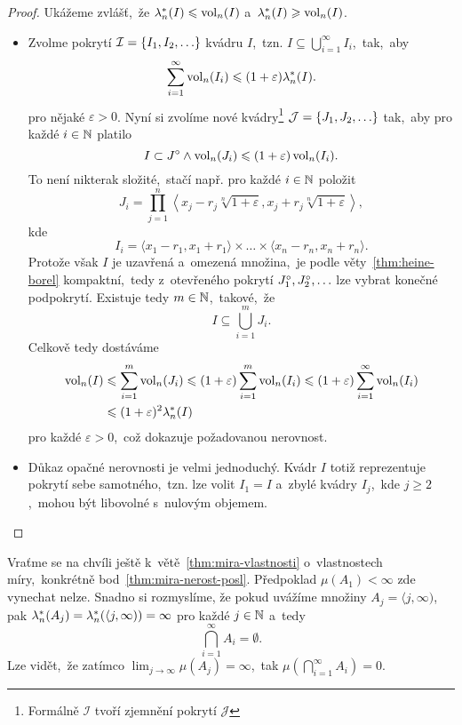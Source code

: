 \begin{proof}
    Ukážeme zvlášť,~že $\lambda_n^*(I)\leqslant\operatorname{vol}_n(I)$ a~$\lambda_n^*(I)\geqslant\operatorname{vol}_n(I)$.
    \begin{itemize}
        \item Zvolme pokrytí $\mathcal{I}=\left\{I_1,I_2,\ldots\right\}$ kvádru $I$,~tzn. $I\subseteq\bigcup_{i=1}^\infty I_i$,~tak,~aby
        \[\sum_{i=1}^{\infty}\operatorname{vol}_n(I_i)\leqslant(1+\varepsilon)\lambda_n^*(I).\]
        pro nějaké $\varepsilon>0$. Nyní si zvolíme nové kvádry\footnote{Formálně $\mathcal{I}$ tvoří zjemnění pokrytí $\mathcal{J}$} $\mathcal{J}=\left\{J_1,J_2,\ldots\right\}$ tak,~aby pro každé $i\in\mathbb{N}$ platilo
        \[I\subset J^\circ\land\operatorname{vol}_n(J_i)\leqslant(1+\varepsilon)\operatorname{vol}_n(I_i).\]
        To není nikterak složité,~stačí např. pro každé $i\in\mathbb{N}$ položit
        \[J_i=\prod_{j=1}^{n}\left\langle x_j-r_j\sqrt[n]{1+\varepsilon},x_j+r_j\sqrt[n]{1+\varepsilon}\right\rangle,\]
        kde
        \[I_i=\langle x_1-r_1,x_1+r_1\rangle\times\ldots\times\langle x_n-r_n,x_n+r_n\rangle.\]
        Protože však $I$ je uzavřená a~omezená množina,~je podle věty~\ref{thm:heine-borel} kompaktní,~tedy z~otevřeného pokrytí $J_1^\circ,J_2^\circ,\ldots$ lze vybrat konečné podpokrytí. Existuje tedy $m\in\mathbb{N}$,~takové,~že
        \[I\subseteq\bigcup_{i=1}^m J_i.\]
        Celkově tedy dostáváme
        \begin{align*}
            \operatorname{vol}_n(I)&\leqslant\sum_{i=1}^{m}\operatorname{vol}_n(J_i)\leqslant(1+\varepsilon)\sum_{i=1}^{m}\operatorname{vol}_n(I_i)\leqslant(1+\varepsilon)\sum_{i=1}^{\infty}\operatorname{vol}_n(I_i)\\
            &\leqslant (1+\varepsilon)^2\lambda_n^*(I)
        \end{align*}
        pro každé $\varepsilon>0$,~což dokazuje požadovanou nerovnost.
        \item Důkaz opačné nerovnosti je velmi jednoduchý. Kvádr $I$ totiž reprezentuje pokrytí sebe samotného,~tzn. lze volit $I_1=I$ a~zbylé kvádry $I_j$,~kde $j\geqslant 2$,~mohou být libovolné s~nulovým objemem.
    \end{itemize}
\end{proof}
\begin{remark}
    Vraťme se na chvíli ještě k~větě~\ref{thm:mira-vlastnosti} o~vlastnostech míry,~konkrétně bod~\ref{thm:mira-nerost-posl}. Předpoklad $\mu(A_1)<\infty$ zde vynechat nelze. Snadno si rozmyslíme, že pokud uvážíme množiny $A_j=\langle j,\infty)$, pak $\lambda_n^*(A_j)=\lambda_n^*(\langle j,\infty))=\infty$ pro každé $j\in\mathbb{N}$ a~tedy
    \[\bigcap_{i=1}^\infty A_i=\emptyset.\]
    Lze vidět,~že zatímco $\lim_{j\to\infty}\mu(A_j)=\infty$,~tak $\mu\left(\bigcap_{i=1}^\infty A_i\right)=0$.
\end{remark}

